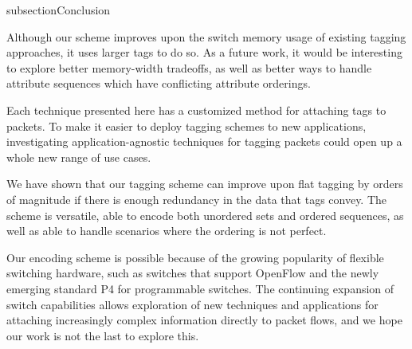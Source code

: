 subsection{Conclusion} \label{sec:conclusion}

Although our scheme improves upon the switch memory usage of existing tagging approaches, it uses larger tags to do so. As a future work, it would be interesting to explore better memory-width tradeoffs, as well as better ways to handle attribute sequences which have conflicting attribute orderings.

Each technique presented here has a customized method for attaching tags to packets. To make it easier to deploy tagging schemes to new applications, investigating application-agnostic techniques for tagging packets could open up a whole new range of use cases. 


We have shown that our tagging scheme can improve upon flat tagging by orders of magnitude if there is enough redundancy in the data that tags convey. The scheme is versatile, able to encode both unordered sets and ordered sequences, as well as able to handle scenarios where the ordering is not perfect. 

Our encoding scheme is possible because of the growing popularity of flexible switching hardware, such as switches that support OpenFlow and the newly emerging standard P4 for programmable switches. The continuing expansion of switch capabilities allows exploration of new techniques and applications for attaching increasingly complex information directly to packet flows, and we hope our work is not the last to explore this. 